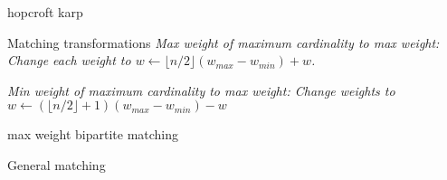 
\begin{algorithm}{hopcroft karp}
\end{algorithm}


\begin{algorithm}{Matching transformations}
\desc
\em Max weight of maximum cardinality to max weight: \em
Change each weight to $w \leftarrow \lfloor n/2 \rfloor (w_{max}-w_{min}) + w$.

\em Min weight of maximum cardinality to max weight: \em
Change weights to $w \leftarrow (\lfloor n/2 \rfloor + 1)(w_{max}-w_{min}) -
w$

\end{algorithm}

\begin{algorithm}{max weight bipartite matching}
\end{algorithm}




\begin{algorithm}{General matching}
\end{algorithm}
